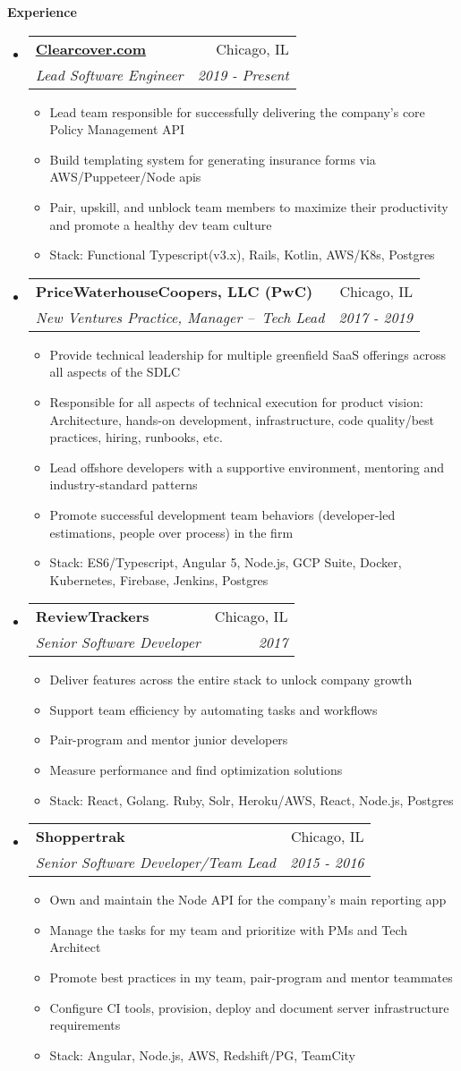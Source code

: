 \documentclass[letterpaper,11pt]{article}
\makeatletter
\newcommand{\resitem}[1]{\item #1 \vspace{-3pt}}
\newcommand{\resheading}[1]{{\large {\textbf{#1 \vphantom{p\^{E}}}}}}
\newcommand{\ressubheading}[4]{
	\begin{tabular*}{6.5in}{l@{\extracolsep{\fill}}r}
			\textbf{#1} & #2 \\
			\textit{#3} & \textit{#4} \\
	\end{tabular*}\vspace{-6pt}}
\makeatother
\begin{document}
\resheading{Experience}
\begin{itemize}

\item
  \ressubheading{\href{https://clearcover.com}{Clearcover.com}}{Chicago, IL}{Lead Software Engineer}{2019 - Present}
	\begin{itemize}
    	\resitem{Lead team responsible for successfully delivering the company's core Policy Management API}
    	\resitem{Build templating system for generating insurance forms via AWS/Puppeteer/Node apis}
		\resitem{Pair, upskill, and unblock team members to maximize their productivity and promote a healthy dev team culture}
		\resitem{Stack: Functional Typescript(v3.x), Rails, Kotlin, AWS/K8s, Postgres}
	\end{itemize}

\item
  \ressubheading{PriceWaterhouseCoopers, LLC (PwC)}{Chicago, IL}{New Ventures Practice, Manager – Tech Lead}{2017 - 2019}
	\begin{itemize}
    \resitem{Provide technical leadership for multiple greenfield SaaS offerings across all aspects of the SDLC}
		\resitem{Responsible for all aspects of technical execution for product vision: Architecture, hands-on development, infrastructure, code quality/best practices, hiring, runbooks, etc.}
		\resitem{Lead offshore developers with a supportive environment, mentoring and industry-standard patterns}
		\resitem{Promote successful development team behaviors (developer-led estimations, people over process) in the firm}
		\resitem{Stack: ES6/Typescript, Angular 5, Node.js, GCP Suite, Docker, Kubernetes, Firebase, Jenkins, Postgres}
	\end{itemize}

\item
  \ressubheading{ReviewTrackers}{Chicago, IL}{Senior Software Developer}{2017}
	\begin{itemize}
    \resitem{Deliver features across the entire stack to unlock company growth}
    \resitem{Support team efficiency by automating tasks and workflows}
    \resitem{Pair-program and mentor junior developers}
    \resitem{Measure performance and find optimization solutions}
        \resitem{Stack: React, Golang. Ruby, Solr, Heroku/AWS, React, Node.js, Postgres}
	\end{itemize}

\item
  \ressubheading{Shoppertrak}{Chicago, IL}{Senior Software Developer/Team Lead}{2015 - 2016}
	\begin{itemize}
    \resitem{Own and maintain the Node API for the company's main reporting app }
    \resitem{Manage the tasks for my team and prioritize with PMs and Tech Architect}
    \resitem{Promote best practices in my team, pair-program and mentor teammates}
    \resitem{Configure CI tools, provision, deploy and document server infrastructure requirements}
     \resitem{Stack: Angular, Node.js, AWS, Redshift/PG, TeamCity}
	\end{itemize}


\end{itemize}
\end{document}
